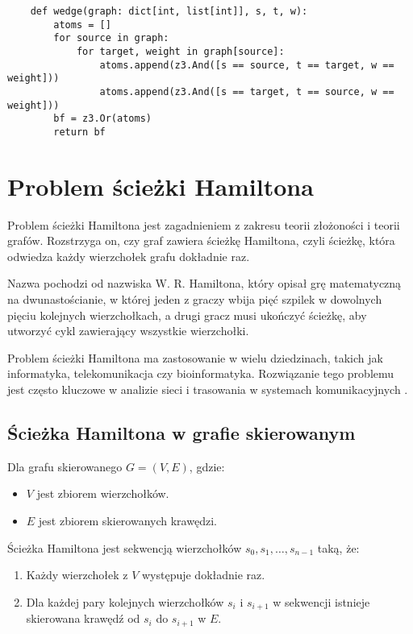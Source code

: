 \begin{lstlisting}
	def wedge(graph: dict[int, list[int]], s, t, w):
		atoms = []
		for source in graph:
			for target, weight in graph[source]:
				atoms.append(z3.And([s == source, t == target, w == weight])) 
				atoms.append(z3.And([s == target, t == source, w == weight]))
		bf = z3.Or(atoms)
		return bf
\end{lstlisting}



\section{Problem ścieżki Hamiltona}

Problem ścieżki Hamiltona jest zagadnieniem z zakresu teorii złożoności i teorii grafów. Rozstrzyga on, czy graf zawiera ścieżkę Hamiltona, czyli ścieżkę, która odwiedza każdy wierzchołek grafu dokładnie raz.

Nazwa pochodzi od nazwiska W. R. Hamiltona, który opisał grę matematyczną na dwunastościanie, w której jeden z graczy wbija pięć szpilek w dowolnych pięciu kolejnych wierzchołkach, a drugi gracz musi ukończyć ścieżkę, aby utworzyć cykl zawierający wszystkie wierzchołki.

Problem ścieżki Hamiltona ma zastosowanie w wielu dziedzinach, takich jak informatyka, telekomunikacja czy bioinformatyka. Rozwiązanie tego problemu jest często kluczowe w analizie sieci i trasowania w systemach komunikacyjnych \cite{enwiki:1190136070}.

\subsection{Ścieżka Hamiltona w grafie skierowanym}

Dla grafu skierowanego $G = (V, E)$, gdzie:
\begin{itemize}
	\item \(V\) jest zbiorem wierzchołków.
	\item \(E\) jest zbiorem skierowanych krawędzi.
\end{itemize}
Ścieżka Hamiltona jest sekwencją wierzchołków $s_0, s_1, …, s_{n-1}$ taką, że:
\begin{enumerate}
	\item Każdy wierzchołek z \(V\) występuje dokładnie raz.
	\item Dla każdej pary kolejnych wierzchołków \(s_i\) i \(s_{i+1}\) w sekwencji istnieje skierowana krawędź od \(s_i\) do \(s_{i+1}\) w \(E\). 
\end{enumerate}

